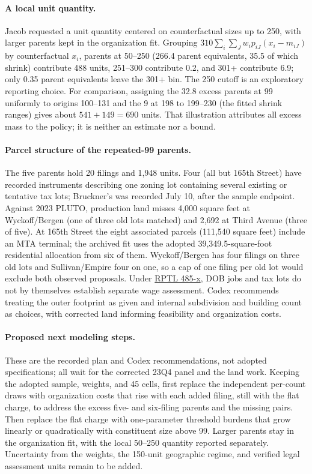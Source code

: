 \paragraph{A local unit quantity.} Jacob requested a unit quantity centered on
counterfactual sizes up to 250, with larger parents kept in the organization
fit. Grouping $310\sum_i\sum_J w_i p_{iJ}(x_i-m_{iJ})$ by counterfactual $x_i$,
parents at 50--250 (266.4 parent equivalents, 35.5 of which shrink) contribute
488 units, 251--300 contribute 0.2, and 301+ contribute 6.9; only 0.35 parent
equivalents leave the 301+ bin. The 250 cutoff is an exploratory reporting
choice. For comparison, assigning the 32.8 excess parents at 99 uniformly to
origins 100--131 and the 9 at 198 to 199--230 (the fitted shrink ranges)
gives about $541+149=690$ units. That illustration attributes all excess mass
to the policy; it is neither an estimate nor a bound.

\paragraph{Parcel structure of the repeated-99 parents.} The five parents
hold 20 filings and 1,948 units. Four (all but 165th Street) have recorded
instruments describing one zoning lot containing several existing or
tentative tax lots; Bruckner's was recorded July 10, after the sample
endpoint. Against 2023 PLUTO, production land misses 4,000 square feet at
Wyckoff/Bergen (one of three old lots matched) and 2,692 at Third Avenue
(three of five). At 165th Street the eight associated parcels (111,540 square
feet) include an MTA terminal; the archived fit uses the adopted
39,349.5-square-foot residential allocation from six of them. Wyckoff/Bergen
has four filings on three old lots and Sullivan/Empire four on one, so a cap
of one filing per old lot would exclude both observed proposals.
Under \href{https://www.nysenate.gov/legislation/laws/RPT/485-X}{RPTL 485-x},
DOB jobs and tax lots do not by themselves establish separate wage assessment.
Codex recommends treating
the outer footprint as given and internal subdivision and building count as
choices, with corrected land informing feasibility and organization costs.

\paragraph{Proposed next modeling steps.} These are the recorded plan and
Codex recommendations, not adopted specifications; all wait for the corrected
23Q4 panel and the land work. Keeping the adopted sample, weights, and 45
cells, first replace the independent per-count draws with organization costs
that rise with each added filing, still with the flat charge, to address the
excess five- and six-filing parents and the missing pairs. Then replace the
flat charge with one-parameter threshold burdens that grow linearly or
quadratically with constituent size above 99. Larger parents stay in the
organization fit, with the local 50--250 quantity reported separately.
Uncertainty from the weights, the 150-unit geographic regime, and verified
legal assessment units remain to be added.

